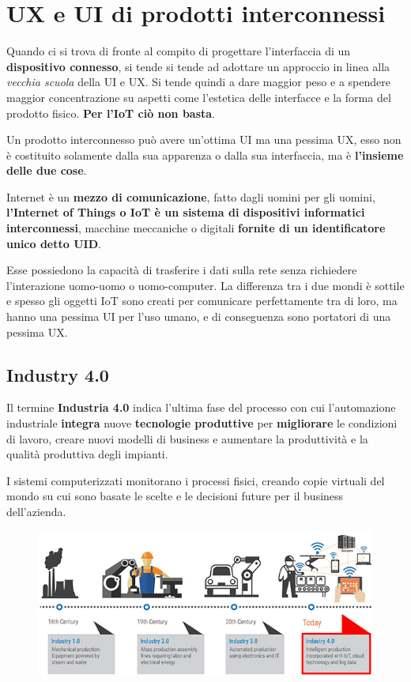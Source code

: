 \chapter{UX e UI di prodotti interconnessi}

Quando ci si trova di fronte al compito di progettare l'interfaccia di un \textbf{dispositivo
	connesso}, si tende si tende ad adottare un approccio in linea alla \textit{vecchia
	scuola} della UI e UX. Si tende quindi a dare maggior peso e a spendere maggior concentrazione su aspetti come l'estetica delle interfacce e la forma del prodotto fisico. \textbf{Per l'IoT ciò non basta}.

Un prodotto interconnesso può avere un'ottima UI ma una pessima UX, esso non è costituito solamente dalla sua apparenza o dalla sua interfaccia, ma è \textbf{l'insieme delle due cose}.

Internet è un \textbf{mezzo di comunicazione}, fatto dagli uomini per gli uomini, \textbf{l'Internet of Things o IoT è un sistema di dispositivi informatici interconnessi}, macchine meccaniche o digitali \textbf{fornite di un identificatore unico detto UID}.

Esse possiedono la capacità di trasferire i dati sulla rete senza richiedere l'interazione uomo-uomo o uomo-computer.
La differenza tra i due mondi è sottile e spesso gli oggetti IoT sono creati per comunicare perfettamente tra di loro, ma hanno una pessima UI per l'uso umano, e
di conseguenza sono portatori di una pessima UX.

\section{Industry 4.0}

Il termine \textbf{Industria 4.0} indica l'ultima fase del processo con cui l'automazione industriale \textbf{integra} nuove \textbf{tecnologie produttive} per \textbf{migliorare} le condizioni di lavoro, creare nuovi modelli di business e aumentare la produttività e la qualità produttiva degli impianti.

I sistemi computerizzati monitorano i processi fisici, creando copie virtuali del mondo su cui sono basate le scelte e le decisioni future per il business dell'azienda.

\begin{figure}[!h]
	\centering
	\includegraphics[scale=0.7]{immagini/Industry4.png}
\end{figure}

